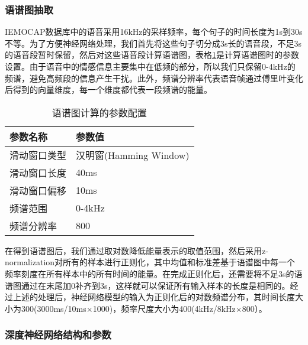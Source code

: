 \subsubsection{语谱图抽取}
\label{ssec:end2end_spectrogram_extract}

IEMOCAP数据库中的语音采用16kHz的采样频率，每个句子的时间长度为1s到30s不等。为了方便神经网络处理，我们首先将这些句子切分成3s长的语音段，不足3s的语音段暂时保留，然后对这些语音段计算语谱图，表格\ref{tab:end2end_spectrogram_setup}是计算语谱图时的参数设置。由于语音中的情感信息主要集中在低频的部分，所以我们只保留0-4kHz的频谱，避免高频段的信息产生干扰。此外，频谱分辨率代表语音帧通过傅里叶变化后得到的向量维度，每一个维度都代表一段频谱的能量。

\begin{table}[htb]
\centering
\begin{minipage}[t]{0.8\linewidth} %
\caption{语谱图计算的参数配置}
\label{tab:end2end_spectrogram_setup}
    \begin{tabularx}{\linewidth}{X<{\centering} X<{\centering}}
        \toprule[1.5pt]
        参数名称 & 参数值 \\
        \midrule[1pt]
        滑动窗口类型 & 汉明窗(Hamming Window) \\
        滑动窗口长度 & 40ms \\
        滑动窗口偏移 & 10ms \\
        频谱范围 & 0-4kHz \\
        频谱分辨率 & 800 \\
        \bottomrule[1.5pt]
    \end{tabularx}
\end{minipage}
\end{table}

在得到语谱图后，我们通过取对数降低能量表示的取值范围，然后采用z-normalization对所有的样本进行正则化，其中均值和标准差基于语谱图中每一个频率刻度在所有样本中的所有时间的能量。在完成正则化后，还需要将不足3s的语谱图通过在末尾加0补齐到3s，这样就可以保证所有输入样本的长度是相同的。经过上述的处理后，神经网络模型的输入为正则化后的对数频谱分布，其时间长度大小为300(3000ms/10ms$\times$1000)，频率尺度大小为400(4kHz/8kHz$\times$800）。

\subsubsection{深度神经网络结构和参数}
\label{ssec:end2end_nn_topology}

